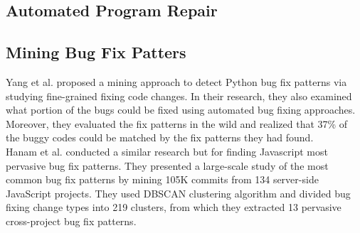 \subsection{Automated Program Repair}


\subsection{Mining Bug Fix Patters}


Yang et al. proposed a mining approach to detect Python bug fix patterns via studying
fine-grained fixing code changes. In their research, they also examined what portion of the bugs
could be fixed using automated bug fixing approaches. Moreover, they evaluated the fix patterns in
the wild and realized that 37\% of the buggy codes could be matched by the fix patterns they had
found. \\
Hanam et al. conducted a similar research but for finding Javascript most pervasive bug fix
patterns. They presented a large-scale study of the most common bug fix patterns by mining 105K
commits from 134 server-side JavaScript projects. They used DBSCAN clustering algorithm
and divided bug fixing change types into 219 clusters, from which they extracted 13 pervasive
cross-project bug fix patterns. \\